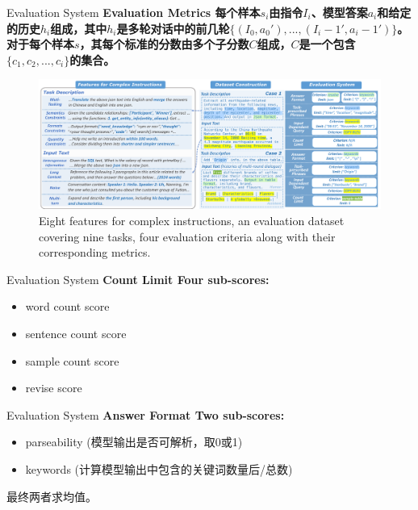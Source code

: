 \documentclass{beamer}
\begin{document}
\begin{frame}{Evaluation System}
    \large\bfseries{Evaluation Metrics}
    \newline
    \normalfont
    每个样本$s_i$由指令$I_i$、模型答案$a_i$和给定的历史$h_i$组成，其中$h_i$是多轮对话中的前几轮$\{(I_0, a_0'), ..., (I_i−1', a_i−1')\}$。对于每个样本$s$，其每个标准的分数由多个子分数$C$组成，$C$是一个包含$\{c_1, c_2, ..., c_i\}$的集合。
    \begin{figure}[h]
        \centering
        \includegraphics[height=.43\textheight]{./images/figures/framework.pdf}
        \caption{Eight features for complex instructions, an evaluation dataset covering nine tasks, four evaluation criteria along with their corresponding metrics.}
    \end{figure}
\end{frame}

\begin{frame}{Evaluation System}
    \large\bfseries{Count Limit}
    \newline
    \normalfont
    Four sub-scores:
    \begin{itemize}
        \item {word count score}
        \item {sentence count score}
        \item {sample count score}
        \item {revise score}
    \end{itemize}
\end{frame}

\begin{frame}{Evaluation System}
    \large\bfseries{Answer Format}
    \newline
    \normalfont
    Two sub-scores:
    \begin{itemize}
        \item {parseability (模型输出是否可解析，取0或1)}
        \item {keywords (计算模型输出中包含的关键词数量后/总数)}
    \end{itemize}
    最终两者求均值。
\end{frame}
\end{document}
